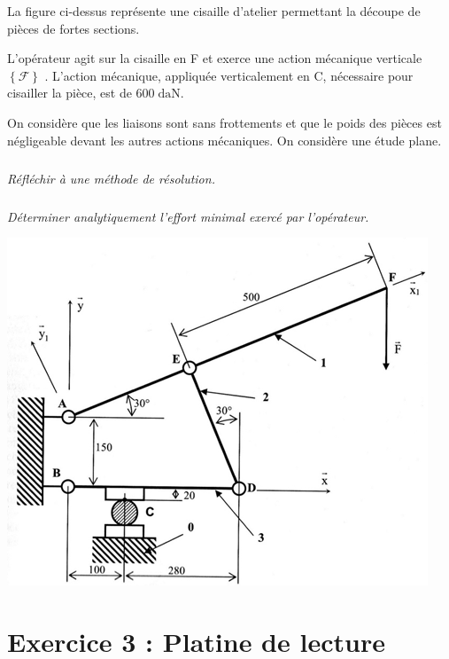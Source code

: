 \documentclass[10pt]{article}
\begin{document}
\begin{minipage}[c]{.58\linewidth}

La figure ci-dessus représente une cisaille d’atelier permettant la découpe de pièces de fortes sections. 

L’opérateur agit sur la cisaille en F et exerce une action mécanique verticale $\left\{\mathcal{F}\right\}$ . L’action mécanique, appliquée verticalement en C, nécessaire pour cisailler la pièce, est de $600\;\text{daN}$.

On considère que les liaisons sont sans frottements et que le poids des pièces est négligeable devant les autres actions mécaniques. On considère une étude plane.


\subparagraph{} \textit{Réfléchir à une méthode de résolution.}

\subparagraph{} \textit{Déterminer analytiquement l'effort minimal exercé par l'opérateur.}

\end{minipage} \hfill
\begin{minipage}[c]{.4\linewidth}
\begin{center}
\includegraphics[width=.95\textwidth]{images/fig2}
\end{center}
\end{minipage}

\newpage

\setcounter{subparagraph}{0}
\section*{Exercice 3 : Platine de lecture}
\end{document}
